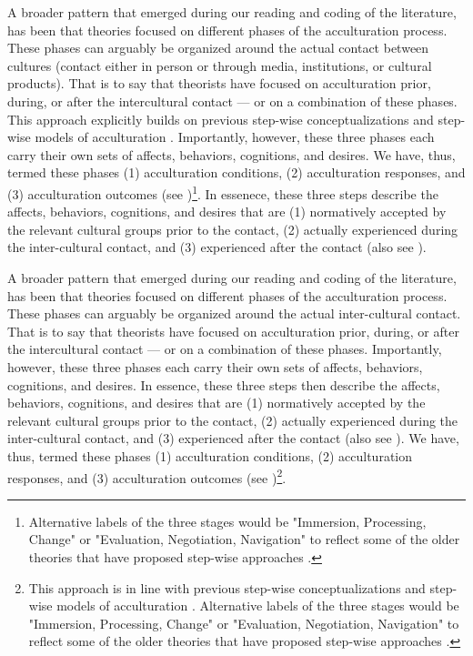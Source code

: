A broader pattern that emerged during our reading and coding of the
literature, has been that theories focused on different phases of the
acculturation process. These phases can arguably be organized around the
actual contact between cultures (contact either in person or through
media, institutions, or cultural products). That is to say that
theorists have focused on acculturation prior, during, or after the
intercultural contact --- or on a combination of these phases. This
approach explicitly builds on previous step-wise conceptualizations
\citep[e.g., process vs. outcome distinction;][]{Sam2006b} and step-wise
models of acculturation
\citep[e.g.,][]{Arends-Toth2006a, TeLindert2008a}. Importantly, however,
these three phases each carry their own sets of affects, behaviors,
cognitions, and desires. We have, thus, termed these phases (1)
acculturation conditions, (2) acculturation responses, and (3)
acculturation outcomes (see
)\footnote{Alternative labels of the three stages would be "Immersion, Processing, Change" or "Evaluation, Negotiation, Navigation" to reflect some of the older theories that have proposed step-wise approaches \citep[e.g.,][]{Cross1991, Atkinson1993, Gordon1964a}.}.
In essenece, these three steps describe the affects, behaviors,
cognitions, and desires that are (1) normatively accepted by the
relevant cultural groups prior to the contact, (2) actually experienced
during the inter-cultural contact, and (3) experienced after the contact
(also see ).

A broader pattern that emerged during our reading and coding of the
literature, has been that theories focused on different phases of the
acculturation process. These phases can arguably be organized around the
actual inter-cultural contact. That is to say that theorists have
focused on acculturation prior, during, or after the intercultural
contact --- or on a combination of these phases. Importantly, however,
these three phases each carry their own sets of affects, behaviors,
cognitions, and desires. In essence, these three steps then describe the
affects, behaviors, cognitions, and desires that are (1) normatively
accepted by the relevant cultural groups prior to the contact, (2)
actually experienced during the inter-cultural contact, and (3)
experienced after the contact (also see ). We
have, thus, termed these phases (1) acculturation conditions, (2)
acculturation responses, and (3) acculturation outcomes (see
)\footnote{This approach is in line with previous step-wise conceptualizations \citep[e.g., process vs. outcome distinction;][]{Sam2006b} and step-wise models of acculturation \citep[e.g.,][]{Arends-Toth2006a, TeLindert2008a}. Alternative labels of the three stages would be "Immersion, Processing, Change" or "Evaluation, Negotiation, Navigation" to reflect some of the older theories that have proposed step-wise approaches \citep[e.g.,][]{Cross1991, Atkinson1993, Gordon1964a}.}.

